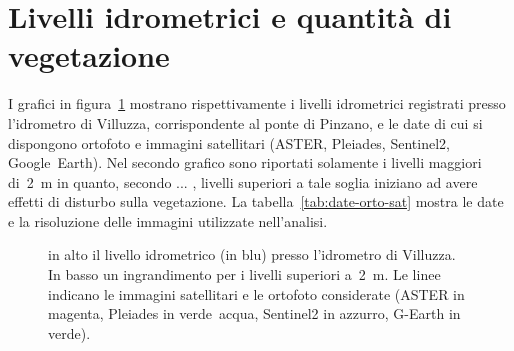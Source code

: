 \documentclass[12pt,a4paper]{article}
\begin{document}
\section{Livelli idrometrici e quantità di vegetazione}
I grafici in figura~\ref{graph:livelli-orto-sat} mostrano rispettivamente i livelli idrometrici registrati presso l'idrometro di Villuzza, corrispondente al ponte di Pinzano, e le date di cui si dispongono ortofoto e immagini satellitari (ASTER, Pleiades, Sentinel2, Google~Earth). 
Nel secondo grafico sono riportati solamente i livelli maggiori di~\SI{2}{\m} in quanto, secondo ...
%
%
, livelli superiori a tale soglia iniziano ad avere effetti di disturbo sulla vegetazione.
La tabella~\ref{tab:date-orto-sat} mostra le date e la risoluzione delle immagini utilizzate nell'analisi.

\begin{figure}[ht]
	\centering
	
	
	\caption[livelli idrometrici e foto aeree - satellitari]{in alto il livello idrometrico (in blu) presso l'idrometro di Villuzza. 
	In basso un ingrandimento per i livelli superiori a~\SI{2}{\m}. Le linee indicano le immagini satellitari e le ortofoto considerate (ASTER in magenta, Pleiades in verde~acqua, Sentinel2 in azzurro, G-Earth in verde).}
	\label{graph:livelli-orto-sat}
\end{figure}
\end{document}
